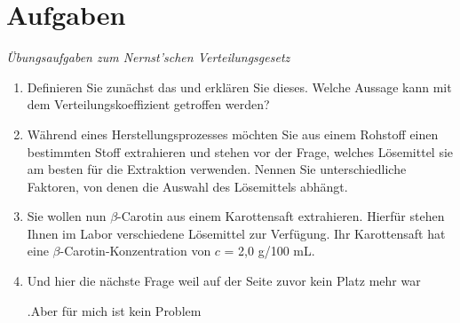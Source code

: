 \documentclass[a4paper,10pt]{article}
\begin{document}
\sidebar





\section{Aufgaben}
\miusquare \textit{Übungsaufgaben zum Nernst'schen Verteilungsgesetz}
\begin{enumerate}[font=\bfseries, itemsep=10pt]
\item Definieren Sie zunächst das  und erklären Sie dieses. Welche Aussage kann mit dem Verteilungskoeffizient getroffen werden?
\item Während eines Herstellungsprozesses möchten Sie aus einem Rohstoff einen bestimmten Stoff extrahieren und stehen vor der Frage, welches Lösemittel sie am besten für die Extraktion verwenden. Nennen Sie unterschiedliche Faktoren, von denen die Auswahl des Lösemittels abhängt.
\item Sie wollen nun $\beta$-Carotin aus einem Karottensaft extrahieren. Hierfür stehen Ihnen im Labor verschiedene Lösemittel zur Verfügung. Ihr Karottensaft hat eine $\beta$-Carotin-Konzentration von $c$ = 2,0 g/100 mL.
		
		
\pagebreak
\sidebar

\item Und hier die nächste Frage weil auf der Seite zuvor kein Platz mehr war

.Aber für mich ist kein Problem
\end{enumerate}	
\end{document}
